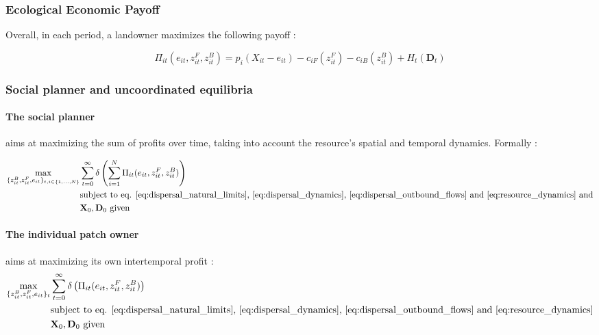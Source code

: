 \documentclass{article}
\begin{document}
\subsubsection{Ecological Economic Payoff}
Overall, in each period, a landowner maximizes the following payoff : 

\begin{equation}
\Pi_{it}(e_{it}, z_{it}^F, z_{it}^B) = p_i(X_{it} - e_{it}) - c_{iF}(z_{it}^F)  - c_{iB}(z_{it}^B) + H_t(\mathbf{D}_t)
\end{equation}

\subsubsection{Social planner and uncoordinated equilibria}

\paragraph{The social planner} aims at maximizing the sum of profits over time, taking into account the resource's spatial and temporal dynamics. Formally : 

\begin{equation}
\begin{aligned}
	\max_{\{z_{it}^B, z_{it}^F, e_{it}\}_{t, i \in \{1, ..., N\}}}& \sum_{t=0}^\infty \delta \left(\sum_{i=1}^N \Pi_{it}(e_{it}, z_{it}^F, z_{it}^B)\right)\\
	& \text{subject to eq. \ref{eq:dispersal_natural_limits}, \ref{eq:dispersal_dynamics}, \ref{eq:dispersal_outbound_flows} and \ref{eq:resource_dynamics} and}\\
	& \mathbf{X}_0, \mathbf{D}_0 \text{ given}
\end{aligned}
\end{equation}

\paragraph{The individual patch owner} aims at maximizing its own intertemporal profit : 
\begin{equation}
\begin{aligned}
	\max_{\{z_{it}^B, z_{it}^F, e_{it}\}_{t}}& \sum_{t=0}^\infty \delta \left(\Pi_{it}(e_{it}, z_{it}^F, z_{it}^B)\right)\\
	& \text{subject to eq. \ref{eq:dispersal_natural_limits}, \ref{eq:dispersal_dynamics}, \ref{eq:dispersal_outbound_flows} and \ref{eq:resource_dynamics}}\\
	& \mathbf{X}_0, \mathbf{D}_0 \text{ given}
\end{aligned}
\end{equation}
\end{document}
